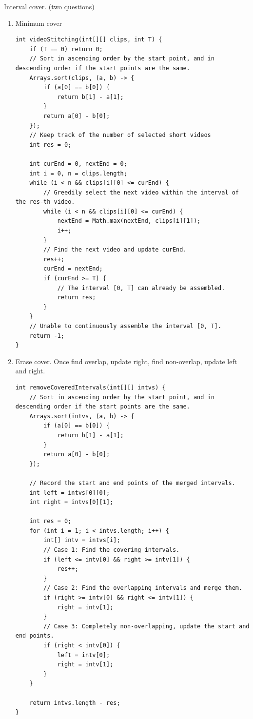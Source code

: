 \documentclass[a4paper,11pt,twoside]{book}
\begin{document}
	\par Interval cover. (two questions)
\begin{enumerate}

	\item Minimum cover

\begin{lstlisting}
int videoStitching(int[][] clips, int T) {
	if (T == 0) return 0;
	// Sort in ascending order by the start point, and in descending order if the start points are the same.
	Arrays.sort(clips, (a, b) -> {
		if (a[0] == b[0]) {
			return b[1] - a[1];
		}
		return a[0] - b[0];
	});
	// Keep track of the number of selected short videos
	int res = 0;
	
	int curEnd = 0, nextEnd = 0;
	int i = 0, n = clips.length;
	while (i < n && clips[i][0] <= curEnd) {
		// Greedily select the next video within the interval of the res-th video.
		while (i < n && clips[i][0] <= curEnd) {
			nextEnd = Math.max(nextEnd, clips[i][1]);
			i++;
		}
		// Find the next video and update curEnd.
		res++;
		curEnd = nextEnd;
		if (curEnd >= T) {
			// The interval [0, T] can already be assembled.
			return res;
		}
	}
	// Unable to continuously assemble the interval [0, T].
	return -1;
}	
\end{lstlisting}

	\item Erase cover. Once find overlap, update right,  find non-overlap, update left and right. 

\begin{lstlisting}
int removeCoveredIntervals(int[][] intvs) {
	// Sort in ascending order by the start point, and in descending order if the start points are the same.
	Arrays.sort(intvs, (a, b) -> {
		if (a[0] == b[0]) {
			return b[1] - a[1];
		}
		return a[0] - b[0]; 
	});
	
	// Record the start and end points of the merged intervals.
	int left = intvs[0][0];
	int right = intvs[0][1];
	
	int res = 0;
	for (int i = 1; i < intvs.length; i++) {
		int[] intv = intvs[i];
		// Case 1: Find the covering intervals.
		if (left <= intv[0] && right >= intv[1]) {
			res++;
		}
		// Case 2: Find the overlapping intervals and merge them.
		if (right >= intv[0] && right <= intv[1]) {
			right = intv[1];
		}
		// Case 3: Completely non-overlapping, update the start and end points.
		if (right < intv[0]) {
			left = intv[0];
			right = intv[1];
		}
	}
	
	return intvs.length - res;
}	
\end{lstlisting} 
	
\end{enumerate}	
	
\end{document}
